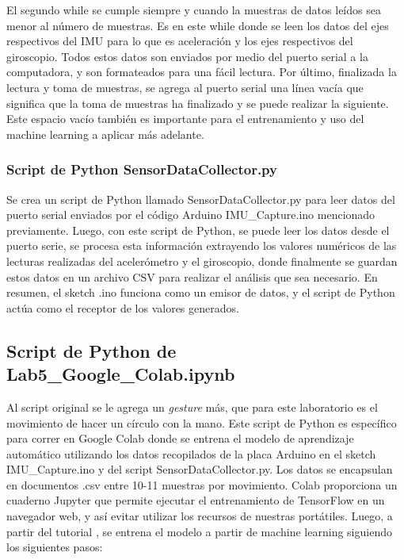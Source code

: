         El segundo while se cumple siempre y cuando la muestras de datos leídos sea menor al número de muestras. Es en este while donde se leen los datos del ejes respectivos del IMU para lo que es aceleración y los ejes respectivos del giroscopio. Todos estos datos son enviados por medio del puerto serial a la computadora, y son formateados para una fácil lectura. Por último, finalizada la lectura y toma de muestras, se agrega al puerto serial una línea vacía que significa que la toma de muestras ha finalizado y se puede realizar la siguiente. Este espacio vacío también es importante para el entrenamiento y uso del machine learning a aplicar más adelante.
        
    \subsubsection{Script de Python SensorDataCollector.py}
    
        Se crea un script de Python llamado SensorDataCollector.py para leer datos del puerto serial enviados por el código  Arduino IMU\_Capture.ino mencionado previamente. Luego, con este script de Python, se puede leer los datos desde el puerto serie, se procesa esta información extrayendo los valores numéricos de las lecturas realizadas del acelerómetro y el giroscopio, donde finalmente se guardan estos datos en un archivo CSV para realizar el análisis que sea necesario. En resumen, el sketch .ino funciona como un emisor de datos, y el script de Python actúa como el receptor de los valores generados.

    \subsection{Script de Python de Lab5\_Google\_Colab.ipynb} 
    Al script original \cite{arduino} se le agrega un \textit{gesture} más, que para este laboratorio es el movimiento de hacer un círculo con la mano.
    Este script de Python es específico para correr en Google Colab donde se entrena el modelo de aprendizaje automático utilizando los datos recopilados de la placa Arduino en el sketch IMU\_Capture.ino y del script SensorDataCollector.py. Los datos se encapsulan en documentos .csv entre 10-11 muestras por movimiento. 
    Colab proporciona un cuaderno Jupyter que permite ejecutar el entrenamiento de TensorFlow en un navegador web, y así evitar utilizar los recursos de nuestras portátiles. Luego, a partir del tutorial \cite{arduino}, se entrena el modelo a partir de machine learning siguiendo los siguientes pasos:

